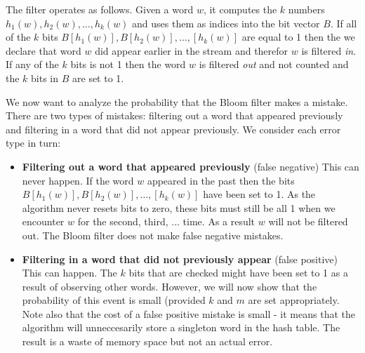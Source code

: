 The filter operates as follows. Given a word $w$, it computes the $k$
numbers $h_1(w),h_2(w),\ldots,h_k(w)$ and uses them as indices into
the bit vector $B$. If all of the $k$ bits
$B[h_1(w)],B[h_2(w)],\ldots,[h_k(w)]$ are equal to 1 then the we
declare that word $w$ did appear earlier in the stream and therefor
$w$ is filtered {\em in}.  If any of the $k$ bits is not 1 then the
word $w$ is filtered {\em out} and not counted and the $k$ bits in $B$
are set to 1.

We now want to analyze the probability that the Bloom filter makes a
mistake. There are two types of mistakes: filtering out a word that
appeared previously and filtering in a word that did not appear
previously. We consider each error type in turn:
\begin{itemize}
\item {\bf Filtering out a word that appeared previously} (false
  negative) This can never happen. If the word $w$ appeared in the
  past then the bits $B[h_1(w)],B[h_2(w)],\ldots,[h_k(w)]$ have been
  set to 1. As the algorithm never resets bits to zero, these bits
  must still be all 1 when we encounter $w$ for the second, third,
  ... time. As a result $w$ will not be filtered out. The Bloom filter
  does not make false negative mistakes.
\item {\bf Filtering in a word that did not previously appear} (false
  positive) This can happen. The $k$ bits that are checked might have
  been set to 1 as a result of observing other words. However, we will
  now show that the probability of this event is small (provided $k$
  and $m$ are set appropriately. Note also that the cost of a false
  positive mistake is small - it means that the algorithm will
  unneccesarily store a singleton word in the hash table. The result
  is a waste of memory space but not an actual error.
\end{itemize}

